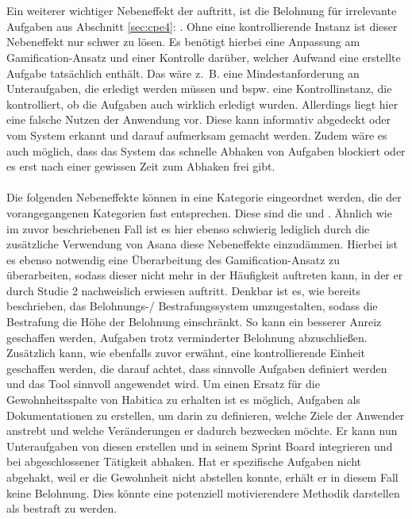\documentclass[sigconf, nonacm]{acmart}
\begin{document}
\\
\\
Ein weiterer wichtiger Nebeneffekt der auftritt, ist die Belohnung für irrelevante Aufgaben aus Abschnitt  \ref{sec:cpe4}: . 
Ohne eine kontrollierende Instanz ist dieser Nebeneffekt nur schwer zu lösen. Es benötigt hierbei eine Anpassung am Gamification-Ansatz und einer Kontrolle darüber, welcher Aufwand eine erstellte Aufgabe tatsächlich enthält. Das wäre z.~B. eine Mindestanforderung an Unteraufgaben, die erledigt werden müssen und bspw. eine Kontrollinstanz, die kontrolliert, ob die Aufgaben auch wirklich erledigt wurden. Allerdings liegt hier eine falsche Nutzen der Anwendung vor. Diese kann informativ abgedeckt oder vom System erkannt und darauf aufmerksam gemacht werden. Zudem wäre es auch möglich, dass das System das schnelle Abhaken von Aufgaben blockiert oder es erst nach einer gewissen Zeit zum Abhaken frei gibt.
\\
\\
Die folgenden Nebeneffekte können in eine Kategorie eingeordnet werden, die der vorangegangenen Kategorien fast entsprechen. Diese sind die und . Ähnlich wie im zuvor beschriebenen Fall ist es hier ebenso schwierig lediglich durch die zusätzliche Verwendung von Asana diese Nebeneffekte einzudämmen. Hierbei ist es ebenso notwendig eine Überarbeitung des Gamification-Ansatz zu überarbeiten, sodass dieser nicht mehr in der Häufigkeit auftreten kann, in der er durch Studie 2 nachweislich erwiesen auftritt. Denkbar ist es, wie bereits beschrieben, das Belohnungs-/ Bestrafungssystem umzugestalten, sodass die Bestrafung die Höhe der Belohnung einschränkt. So kann ein besserer Anreiz geschaffen werden, Aufgaben trotz verminderter Belohnung abzuschließen. Zusätzlich kann, wie ebenfalls zuvor erwähnt, eine kontrollierende Einheit geschaffen werden, die darauf achtet, dass sinnvolle Aufgaben definiert werden und das Tool sinnvoll angewendet wird. Um einen Ersatz für die Gewohnheitsspalte von Habitica zu erhalten ist es möglich, Aufgaben als Dokumentationen zu erstellen, um darin zu definieren, welche Ziele der Anwender anstrebt und welche Veränderungen er dadurch bezwecken möchte. Er kann nun Unteraufgaben von diesen erstellen und in seinem Sprint Board integrieren und bei abgeschlossener Tätigkeit abhaken. Hat er spezifische Aufgaben nicht abgehakt, weil er die Gewohnheit nicht abstellen konnte, erhält er in diesem Fall keine Belohnung.  Dies könnte eine potenziell motivierendere Methodik darstellen als bestraft zu werden.
\end{document}
